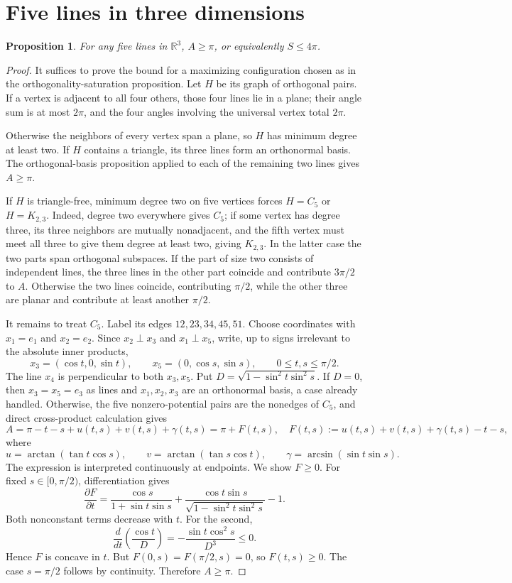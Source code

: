 \documentclass[11pt]{article}
\newtheorem{proposition}{Proposition}
\begin{document}
\section*{Five lines in three dimensions}

\begin{proposition}
For any five lines in $\mathbb R^3$, $A\geq\pi$, or equivalently
$S\leq4\pi$.
\end{proposition}
\begin{proof}
It suffices to prove the bound for a maximizing configuration chosen
as in the orthogonality-saturation proposition.  Let $H$ be its graph
of orthogonal pairs.  If a vertex is adjacent to all four others,
those four lines lie in a plane; their angle sum is at most $2\pi$,
and the four angles involving the universal vertex total $2\pi$.

Otherwise the neighbors of every vertex span a plane, so $H$ has
minimum degree at least two.  If $H$ contains a triangle, its three
lines form an orthonormal basis.  The orthogonal-basis proposition
applied to each of the remaining two lines gives $A\geq\pi$.

If $H$ is triangle-free, minimum degree two on five vertices forces
$H=C_5$ or $H=K_{2,3}$.  Indeed, degree two everywhere gives $C_5$;
if some vertex has degree three, its three neighbors are mutually
nonadjacent, and the fifth vertex must meet all three to give them
degree at least two, giving $K_{2,3}$.  In the latter case the two
parts span orthogonal subspaces.  If the part of size two consists
of independent lines, the three lines in the other part coincide
and contribute $3\pi/2$ to $A$.  Otherwise the two lines coincide,
contributing $\pi/2$, while the other three are planar and
contribute at least another $\pi/2$.

It remains to treat $C_5$.  Label its edges
$12,23,34,45,51$.  Choose coordinates with $x_1=e_1$ and
$x_2=e_2$.  Since $x_2\perp x_3$ and $x_1\perp x_5$, write,
up to signs irrelevant to the absolute inner products,
\[
 x_3=(\cos t,0,\sin t),\qquad
 x_5=(0,\cos s,\sin s),\qquad 0\leq t,s\leq\pi/2.
\]
The line $x_4$ is perpendicular to both $x_3,x_5$.  Put
$D=\sqrt{1-\sin^2t\sin^2s}$.  If $D=0$, then $x_3=x_5=e_3$
as lines and $x_1,x_2,x_3$ are an orthonormal basis, a case already
handled.  Otherwise, the five nonzero-potential pairs are the
nonedges of $C_5$, and direct cross-product calculation gives
\[
 A=\pi-t-s+u(t,s)+v(t,s)+\gamma(t,s)
  =\pi+F(t,s),
 \quad F(t,s):=u(t,s)+v(t,s)+\gamma(t,s)-t-s,
\]
where
\[
 u=\arctan(\tan t\cos s),\qquad
 v=\arctan(\tan s\cos t),\qquad
 \gamma=\arcsin(\sin t\sin s).
\]
The expression is interpreted continuously at endpoints.  We show
$F\geq0$.  For fixed $s\in[0,\pi/2)$, differentiation gives
\[
 \frac{\partial F}{\partial t}
 =\frac{\cos s}{1+\sin t\sin s}
  +\frac{\cos t\sin s}{\sqrt{1-\sin^2t\sin^2s}}-1.
\]
Both nonconstant terms decrease with $t$.  For the second,
\[
 \frac{d}{dt}\left(\frac{\cos t}{D}\right)
 =-\frac{\sin t\cos^2s}{D^3}\leq0.
\]
Hence $F$ is concave in $t$.
But $F(0,s)=F(\pi/2,s)=0$, so $F(t,s)\geq0$.
The case $s=\pi/2$ follows by continuity.  Therefore $A\geq\pi$.
\end{proof}
\end{document}
